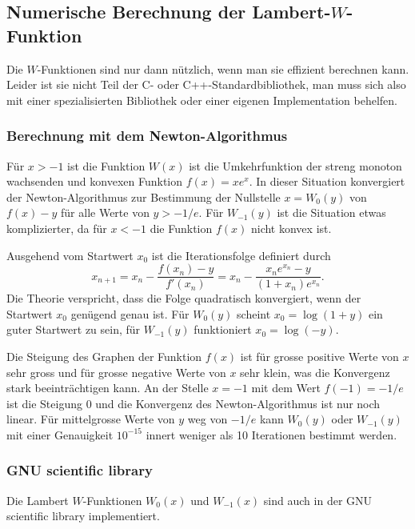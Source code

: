 %
%
\subsection{Numerische Berechnung der Lambert-$W$-Funktion
\label{buch:subsection:lambertberechnung}}
Die $W$-Funktionen sind nur dann nützlich, wenn man sie effizient
berechnen kann.
Leider ist sie nicht Teil der C- oder C++-Standardbibliothek,
man muss sich also mit einer spezialisierten Bibliothek oder einer
eigenen Implementation behelfen.

%
%
\subsubsection{Berechnung mit dem Newton-Algorithmus}
Für $x>-1$ ist die Funktion $W(x)$ ist die Umkehrfunktion der
streng monoton wachsenden und konvexen Funktion $f(x)=xe^x$.
In dieser Situation konvergiert der Newton-Algorithmus zur Bestimmung
der Nullstelle $x=W_0(y)$ von $f(x)-y$ für alle Werte von $y>-1/e$.
Für $W_{-1}(y)$ ist die Situation etwas komplizierter, da für
$x<-1$ die Funktion $f(x)$ nicht konvex ist.

Ausgehend vom Startwert $x_0$ ist die Iterationsfolge definiert
durch
\[
x_{n+1}
=
x_n - \frac{f(x_n) - y}{f'(x_n)}
=
x_n - \frac{x_ne^{x_n}-y}{(1+x_n)e^{x_n}}.
\]
Die Theorie verspricht, dass die Folge quadratisch konvergiert, wenn
der Startwert $x_0$ genügend genau ist.
Für $W_0(y)$ scheint $x_0=\log(1+y)$ ein guter Startwert zu sein, für
$W_{-1}(y)$ funktioniert $x_0=\log(-y)$.

Die Steigung des Graphen der Funktion $f(x)$ ist für grosse positive
Werte von $x$ sehr gross und für grosse negative Werte von $x$ sehr
klein, was die Konvergenz stark beeinträchtigen kann.
An der Stelle $x=-1$ mit dem Wert $f(-1)=-1/e$ ist die Steigung $0$
und die Konvergenz des Newton-Algorithmus ist nur noch linear.
Für mittelgrosse Werte von $y$ weg von $-1/e$ kann $W_0(y)$ oder $W_{-1}(y)$ 
mit einer Genauigkeit $10^{-15}$ innert weniger als 10 Iterationen
bestimmt werden.

\subsubsection{GNU scientific library}
Die Lambert $W$-Funktionen $W_0(x)$ und $W_{-1}(x)$ sind auch in der
GNU scientific library \cite{buch:library:gsl} implementiert.









